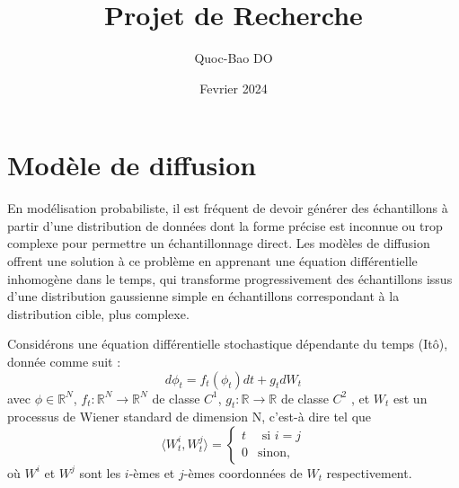 \documentclass[a4paper,10pt]{article}
\title{Projet de Recherche}
\author{Quoc-Bao DO}
\date{Fevrier 2024}
\theoremstyle{definition} %
\theoremstyle{definition} %
\theoremstyle{definition} %
\theoremstyle{definition} %
\newcommand{\R}{\mathbb{R}}
\begin{document}
\maketitle

\section{Modèle de diffusion}

    En modélisation probabiliste, il est fréquent de devoir générer des échantillons à partir d'une distribution de données dont la forme précise est inconnue ou trop complexe pour permettre un échantillonnage direct. Les modèles de diffusion offrent une solution à ce problème en apprenant une équation différentielle inhomogène dans le temps, qui transforme progressivement des échantillons issus d'une distribution gaussienne simple en échantillons correspondant à la distribution cible, plus complexe.

Considérons une équation différentielle stochastique dépendante du temps (Itô), donnée comme suit :
    \begin{equation}\label{eq:SDE}
         d\phi_t = f_t(\phi_t)dt + g_tdW_t
    \end{equation}
    avec $\phi \in \R^N$, $f_t:\R^N \rightarrow \R^N$ de classe $C^1$, $g_t : \R \rightarrow \R$ de classe $C^2$ , et $W_t$ est un processus de Wiener standard de dimension N, c'est-à dire tel que 
\begin{equation}
    \langle W_t^i, W_t^j \rangle =
        \begin{cases}    
            t & \textrm{ si } i=j \\
            0 & \textrm{sinon},
        \end{cases}
\end{equation}
où $W^i$ et $W^j$ sont les $i$-èmes et $j$-èmes coordonnées de $W_t$ respectivement. 
\end{document}
